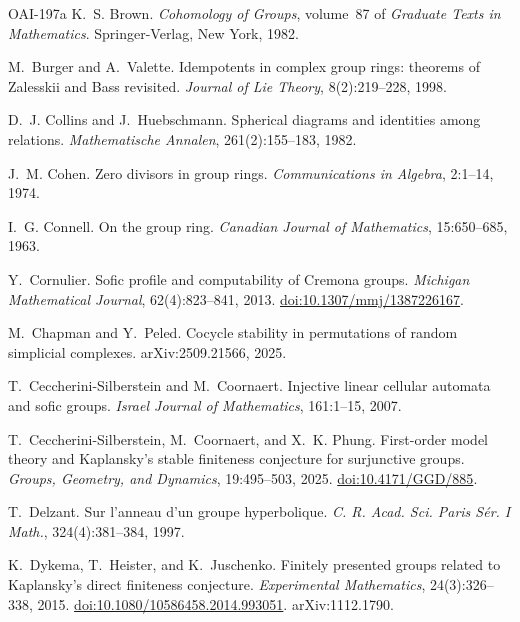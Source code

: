 \documentclass[11pt]{article}
\theoremstyle{definition}
\theoremstyle{plain}
\newcommand{\doi}[1]{\href{https://doi.org/#1}{doi:#1}}
\begin{document}
\begin{thebibliography}{OAI-197a}
K.~S. Brown.
\newblock \emph{Cohomology of Groups}, volume~87 of \emph{Graduate Texts in Mathematics}.
\newblock Springer-Verlag, New York, 1982.

M.~Burger and A.~Valette.
\newblock Idempotents in complex group rings: theorems of Zalesskii and Bass revisited.
\newblock \emph{Journal of Lie Theory}, 8(2):219--228, 1998.

D.~J. Collins and J.~Huebschmann.
\newblock Spherical diagrams and identities among relations.
\newblock \emph{Mathematische Annalen}, 261(2):155--183, 1982.

J.~M. Cohen.
\newblock Zero divisors in group rings.
\newblock \emph{Communications in Algebra}, 2:1--14, 1974.

I.~G. Connell.
\newblock On the group ring.
\newblock \emph{Canadian Journal of Mathematics}, 15:650--685, 1963.

Y.~Cornulier.
\newblock Sofic profile and computability of Cremona groups.
\newblock \emph{Michigan Mathematical Journal}, 62(4):823--841, 2013. \doi{10.1307/mmj/1387226167}.

M.~Chapman and Y.~Peled.
\newblock Cocycle stability in permutations of random simplicial complexes.
\newblock arXiv:2509.21566, 2025.

T.~Ceccherini-Silberstein and M.~Coornaert.
\newblock Injective linear cellular automata and sofic groups.
\newblock \emph{Israel Journal of Mathematics}, 161:1--15, 2007.

T.~Ceccherini-Silberstein, M.~Coornaert, and X.~K. Phung.
\newblock First-order model theory and {K}aplansky's stable finiteness conjecture for surjunctive groups.
\newblock \emph{Groups, Geometry, and Dynamics}, 19:495--503, 2025. \doi{10.4171/GGD/885}.

T.~Delzant.
\newblock Sur l'anneau d'un groupe hyperbolique.
\newblock \emph{C. R. Acad. Sci. Paris S\'er. I Math.}, 324(4):381--384, 1997.

K.~Dykema, T.~Heister, and K.~Juschenko.
\newblock Finitely presented groups related to {K}aplansky's direct finiteness conjecture.
\newblock \emph{Experimental Mathematics}, 24(3):326--338, 2015. \doi{10.1080/10586458.2014.993051}. arXiv:1112.1790.


\end{thebibliography}
\end{document}
